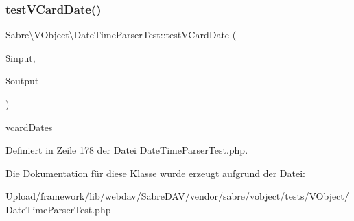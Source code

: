 \subsubsection{\texorpdfstring{test\+V\+Card\+Date()}{testVCardDate()}}
{\footnotesize\ttfamily Sabre\textbackslash{}\+V\+Object\textbackslash{}\+Date\+Time\+Parser\+Test\+::test\+V\+Card\+Date (\begin{DoxyParamCaption}\item[{}]{\$input,  }\item[{}]{\$output }\end{DoxyParamCaption})}

vcard\+Dates 

Definiert in Zeile 178 der Datei Date\+Time\+Parser\+Test.\+php.



Die Dokumentation für diese Klasse wurde erzeugt aufgrund der Datei\+:\begin{DoxyCompactItemize}
\item 
Upload/framework/lib/webdav/\+Sabre\+D\+A\+V/vendor/sabre/vobject/tests/\+V\+Object/Date\+Time\+Parser\+Test.\+php\end{DoxyCompactItemize}
